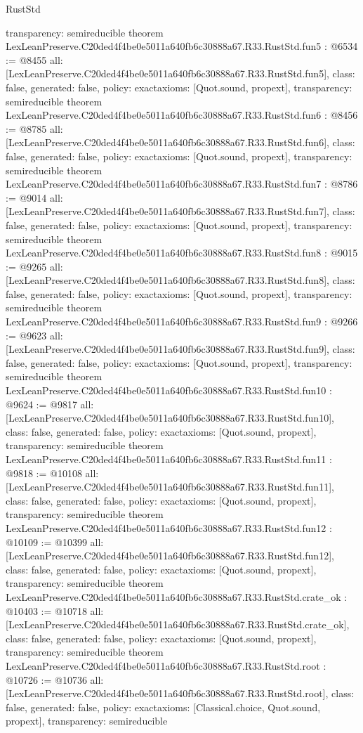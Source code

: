 \begin{lexlean}{RustStd}
\begin{coremodule}
{  transparency: semireducible
}
theorem LexLeanPreserve.C20ded4f4be0e5011a640fb6c30888a67.R33.RustStd.fun5 : @6534 := @8455 {
  all: [LexLeanPreserve.C20ded4f4be0e5011a640fb6c30888a67.R33.RustStd.fun5],
  class: false,
  generated: false,
  policy: exact{axioms: [Quot.sound, propext]},
  transparency: semireducible
}
theorem LexLeanPreserve.C20ded4f4be0e5011a640fb6c30888a67.R33.RustStd.fun6 : @8456 := @8785 {
  all: [LexLeanPreserve.C20ded4f4be0e5011a640fb6c30888a67.R33.RustStd.fun6],
  class: false,
  generated: false,
  policy: exact{axioms: [Quot.sound, propext]},
  transparency: semireducible
}
theorem LexLeanPreserve.C20ded4f4be0e5011a640fb6c30888a67.R33.RustStd.fun7 : @8786 := @9014 {
  all: [LexLeanPreserve.C20ded4f4be0e5011a640fb6c30888a67.R33.RustStd.fun7],
  class: false,
  generated: false,
  policy: exact{axioms: [Quot.sound, propext]},
  transparency: semireducible
}
theorem LexLeanPreserve.C20ded4f4be0e5011a640fb6c30888a67.R33.RustStd.fun8 : @9015 := @9265 {
  all: [LexLeanPreserve.C20ded4f4be0e5011a640fb6c30888a67.R33.RustStd.fun8],
  class: false,
  generated: false,
  policy: exact{axioms: [Quot.sound, propext]},
  transparency: semireducible
}
theorem LexLeanPreserve.C20ded4f4be0e5011a640fb6c30888a67.R33.RustStd.fun9 : @9266 := @9623 {
  all: [LexLeanPreserve.C20ded4f4be0e5011a640fb6c30888a67.R33.RustStd.fun9],
  class: false,
  generated: false,
  policy: exact{axioms: [Quot.sound, propext]},
  transparency: semireducible
}
theorem LexLeanPreserve.C20ded4f4be0e5011a640fb6c30888a67.R33.RustStd.fun10 : @9624 := @9817 {
  all: [LexLeanPreserve.C20ded4f4be0e5011a640fb6c30888a67.R33.RustStd.fun10],
  class: false,
  generated: false,
  policy: exact{axioms: [Quot.sound, propext]},
  transparency: semireducible
}
theorem LexLeanPreserve.C20ded4f4be0e5011a640fb6c30888a67.R33.RustStd.fun11 : @9818 := @10108 {
  all: [LexLeanPreserve.C20ded4f4be0e5011a640fb6c30888a67.R33.RustStd.fun11],
  class: false,
  generated: false,
  policy: exact{axioms: [Quot.sound, propext]},
  transparency: semireducible
}
theorem LexLeanPreserve.C20ded4f4be0e5011a640fb6c30888a67.R33.RustStd.fun12 : @10109 := @10399 {
  all: [LexLeanPreserve.C20ded4f4be0e5011a640fb6c30888a67.R33.RustStd.fun12],
  class: false,
  generated: false,
  policy: exact{axioms: [Quot.sound, propext]},
  transparency: semireducible
}
theorem LexLeanPreserve.C20ded4f4be0e5011a640fb6c30888a67.R33.RustStd.crate_ok : @10403 := @10718 {
  all: [LexLeanPreserve.C20ded4f4be0e5011a640fb6c30888a67.R33.RustStd.crate_ok],
  class: false,
  generated: false,
  policy: exact{axioms: [Quot.sound, propext]},
  transparency: semireducible
}
theorem LexLeanPreserve.C20ded4f4be0e5011a640fb6c30888a67.R33.RustStd.root : @10726 := @10736 {
  all: [LexLeanPreserve.C20ded4f4be0e5011a640fb6c30888a67.R33.RustStd.root],
  class: false,
  generated: false,
  policy: exact{axioms: [Classical.choice, Quot.sound, propext]},
  transparency: semireducible
}


\end{coremodule}
\end{lexlean}
